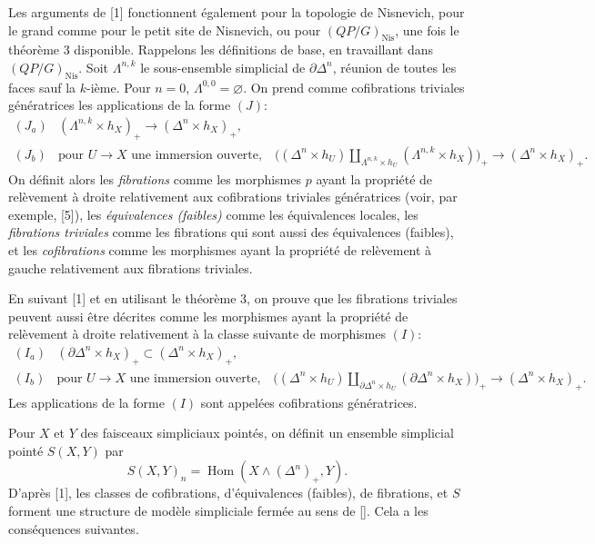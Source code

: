 \documentclass[11pt]{article}
\newcommand{\Nis}{\mathrm{Nis}}
\newcommand{\Hom}{\operatorname{Hom}}
\theoremstyle{deligne}
\begin{document}
Les arguments de [1] fonctionnent également pour la topologie de Nisnevich, pour le grand comme pour le petit site de Nisnevich, ou pour \((QP/G)_{\Nis}\), une fois le théorème 3 disponible. Rappelons les définitions de base, en travaillant dans \((QP/G)_{\Nis}\). Soit \(\Lambda^{n,k}\) le sous-ensemble simplicial de \(\partial\Delta^n\), réunion de toutes les faces sauf la \(k\)-ième. Pour \(n=0\), \(\Lambda^{0,0}=\varnothing\). On prend comme cofibrations triviales génératrices les applications de la forme \((J)\):
\[
\begin{array}{ll}
(J_a) & (\Lambda^{n,k}\times h_X)_+\longrightarrow (\Delta^n\times h_X)_+,\\[0.4em]
(J_b) & \text{pour } U\to X \text{ une immersion ouverte,}\quad
\bigl((\Delta^n\times h_U)\coprod_{\Lambda^{n,k}\times h_U}(\Lambda^{n,k}\times h_X)\bigr)_+
\longrightarrow (\Delta^n\times h_X)_+.
\end{array}
\]
On définit alors les \emph{fibrations} comme les morphismes \(p\) ayant la propriété de relèvement à droite relativement aux cofibrations triviales génératrices (voir, par exemple, [5]), les \emph{équivalences (faibles)} comme les équivalences locales, les \emph{fibrations triviales} comme les fibrations qui sont aussi des équivalences (faibles), et les \emph{cofibrations} comme les morphismes ayant la propriété de relèvement à gauche relativement aux fibrations triviales.

En suivant [1] et en utilisant le théorème 3, on prouve que les fibrations triviales peuvent aussi être décrites comme les morphismes ayant la propriété de relèvement à droite relativement à la classe suivante de morphismes \((I)\):
\[
\begin{array}{ll}
(I_a) & (\partial\Delta^n\times h_X)_+\subset (\Delta^n\times h_X)_+,\\[0.4em]
(I_b) & \text{pour } U\to X \text{ une immersion ouverte,}\quad
\bigl((\Delta^n\times h_U)\coprod_{\partial\Delta^n\times h_U}(\partial\Delta^n\times h_X)\bigr)_+
\longrightarrow (\Delta^n\times h_X)_+.
\end{array}
\]
Les applications de la forme \((I)\) sont appelées cofibrations génératrices.

Pour \(X\) et \(Y\) des faisceaux simpliciaux pointés, on définit un ensemble simplicial pointé \(S(X,Y)\) par
\[
S(X,Y)_n=\Hom(X\wedge(\Delta^n)_+,Y).
\]
D'après [1], les classes de cofibrations, d'équivalences (faibles), de fibrations, et \(S\) forment une structure de modèle simpliciale fermée au sens de []. Cela a les conséquences suivantes.
\end{document}
